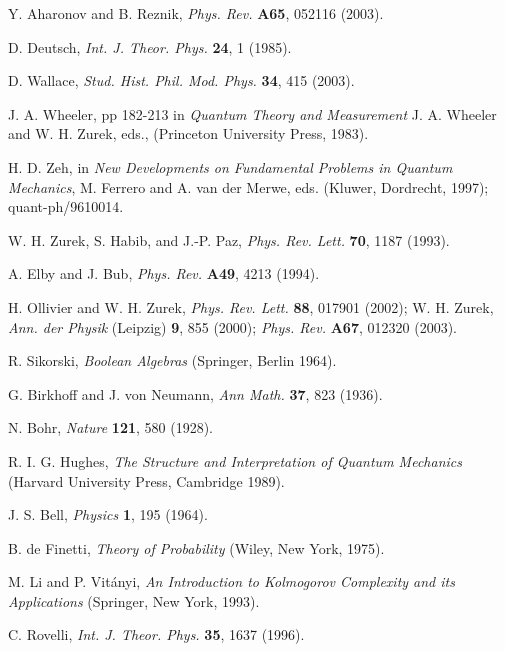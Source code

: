 \documentclass[aps,pra,epsfig,11pt,floatfix]{revtex4}
\begin{document}
\noindent[34] Y. Aharonov and B. Reznik, {\it Phys. Rev.} {\bf A65}, 
052116 (2003).


\noindent[35] D. Deutsch, {\it Int. J. Theor. Phys.} {\bf 24}, 1 (1985).

\noindent[36] D. Wallace, {\it Stud. Hist. Phil. Mod. Phys.} 
{\bf 34}, 415 (2003).

\noindent[37] J. A. Wheeler, pp 182-213 in {\it Quantum Theory and
Measurement} J. A. Wheeler and W. H. Zurek, eds., 
(Princeton University Press, 1983).

\noindent[38] H. D. Zeh, in {\it New Developments on Fundamental Problems 
in Quantum Mechanics}, M. Ferrero and A. van der Merwe, eds. 
(Kluwer, Dordrecht, 1997); quant-ph/9610014.

\noindent[39] W. H. Zurek, S. Habib, and J.-P. Paz, 
{\it Phys. Rev. Lett.} {\bf 70}, 1187 (1993).

\noindent[40] A. Elby and J. Bub, {\it Phys. Rev.} {\bf A49}, 4213 (1994).

\noindent[41] H. Ollivier and W. H. Zurek, {\it Phys. Rev. Lett.} 
{\bf 88}, 017901 (2002); 
W. H. Zurek, {\it Ann. der Physik} (Leipzig) {\bf 9}, 855 (2000);
{\it Phys. Rev.} {\bf A67}, 012320 (2003).

\noindent[42] R. Sikorski, {\it Boolean Algebras} (Springer, Berlin 1964).

\noindent[43] G. Birkhoff and J. von Neumann, {\it Ann Math.} 
{\bf 37}, 823 (1936).

\noindent[44] N. Bohr, {\it Nature} {\bf 121}, 580 (1928).

\noindent[45] R. I. G. Hughes, {\it The Structure and Interpretation 
of Quantum Mechanics} (Harvard University Press, Cambridge 1989).

\noindent[46] J. S. Bell, {\it Physics} {\bf 1}, 195 (1964).

\noindent[47] B. de Finetti, {\it Theory of Probability} 
(Wiley, New York, 1975).

\noindent[48] M. Li and P. Vit\'anyi, {\it An Introduction 
to Kolmogorov Complexity and
its Applications} (Springer, New York, 1993).

\noindent[49] C. Rovelli, {\it Int. J. Theor. Phys.} {\bf 35}, 1637 (1996).
\end{document}

